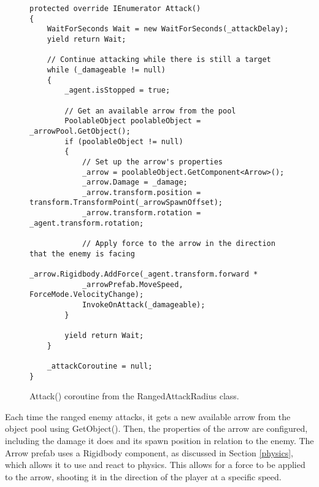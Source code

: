 \documentclass[10pt]{final_report}
\begin{document}
\begin{figure}[H]
\begin{verbatim}
protected override IEnumerator Attack()
{
    WaitForSeconds Wait = new WaitForSeconds(_attackDelay);
    yield return Wait;

    // Continue attacking while there is still a target
    while (_damageable != null)
    {
        _agent.isStopped = true;

        // Get an available arrow from the pool
        PoolableObject poolableObject = _arrowPool.GetObject();
        if (poolableObject != null)
        {
            // Set up the arrow's properties
            _arrow = poolableObject.GetComponent<Arrow>();
            _arrow.Damage = _damage;
            _arrow.transform.position = transform.TransformPoint(_arrowSpawnOffset);
            _arrow.transform.rotation = _agent.transform.rotation;

            // Apply force to the arrow in the direction that the enemy is facing
            _arrow.Rigidbody.AddForce(_agent.transform.forward * 
			_arrowPrefab.MoveSpeed, ForceMode.VelocityChange);
            InvokeOnAttack(_damageable);
        }
            
        yield return Wait;
    }

    _attackCoroutine = null;
}
\end{verbatim}
\caption{Attack() coroutine from the RangedAttackRadius class.}
\label{attackcoroutine2}
\end{figure}

Each time the ranged enemy attacks, it gets a new available arrow from the object pool using GetObject(). Then, the properties of the arrow are configured, including the damage it does and its spawn position in relation to the enemy. The Arrow prefab uses a Rigidbody component, as discussed in Section \ref{physics}, which allows it to use and react to physics. This allows for a force to be applied to the arrow, shooting it in the direction of the player at a specific speed. 

\end{document}

